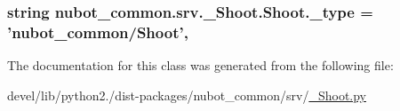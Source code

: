 \hypertarget{classnubot__common_1_1srv_1_1__Shoot_1_1Shoot_a3498f426a18fa1843afc111ed73c1fc4}{
\subsubsection[{\-\_\-type}]{\setlength{\rightskip}{0pt plus 5cm}string nubot\-\_\-common.\-srv.\-\_\-\-Shoot.\-Shoot.\-\_\-type = 'nubot\-\_\-common/{\bf Shoot}'\hspace{0.3cm}{\ttfamily [static]}, {\ttfamily [private]}}}\label{classnubot__common_1_1srv_1_1__Shoot_1_1Shoot_a3498f426a18fa1843afc111ed73c1fc4}


The documentation for this class was generated from the following file\-:\begin{DoxyCompactItemize}
\item 
devel/lib/python2./dist-\/packages/nubot\-\_\-common/srv/\hyperlink{__Shoot_8py}{\-\_\-\-Shoot.\-py}\end{DoxyCompactItemize}
